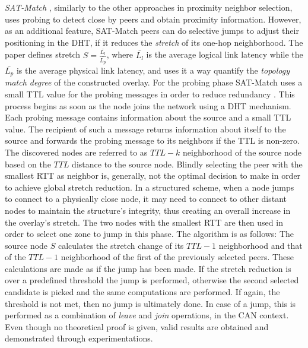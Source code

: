 \emph{SAT-Match} \cite{RGJZ2004}, similarly to the other approaches in proximity
neighbor selection, uses probing to detect close by peers and obtain proximity
information. However, as an additional feature, SAT-Match peers can do selective
jumps to adjust their positioning in the DHT, if it reduces the \emph{stretch}
of its one-hop neighborhood. The paper defines stretch 
$S = \frac{\bar{L_l}}{\bar{L_p}}$, where $\bar{L_l}$ is the average logical link
latency while the $\bar{L_p}$ is the average physical link latency, and uses it
a way quantify the \emph{topology match degree} of the constructed overlay. For
the probing phase SAT-Match uses a small TTL value for the probing messages in
order to reduce redundancy \cite{jiang_lightflood_2008}. This process begins as
soon as the node joins the network using a DHT mechanism. Each probing message
contains information about the source and a small TTL value. The recipient of
such a message returns information about itself to the source and forwards the
probing message to its neighbors if the TTL is non-zero. The discovered nodes
are referred to as $TTL-k$ neighborhood of the source node based on the $TTL$
distance to the source node. Blindly selecting the peer with the smallest RTT
as neighbor is, generally, not the optimal decision to make in order to achieve
global stretch reduction. In a structured scheme, when a node jumps to connect
to a physically close node, it may need to connect to other distant nodes to
maintain the structure's integrity, thus creating an overall increase in the
overlay's stretch. The two nodes with the smallest RTT are then used in order to
select one zone to jump in this phase. The algorithm is as follows: The source
node $S$ calculates the stretch change of its $TTL-1$ neighborhood and that of
the $TTL-1$ neighborhood of the first of the previously selected peers. These
calculations are made as if the jump has been made. If the stretch reduction is
over a predefined threshold the jump is performed, otherwise the second selected
candidate is picked and the same computations are performed. If again, the
threshold is not met, then no jump is ultimately done. In case of a jump, this
is performed as a combination of \emph{leave} and \emph{join} operations, in the
CAN context. Even though no theoretical proof is given, valid results are
obtained and demonstrated through experimentations.

